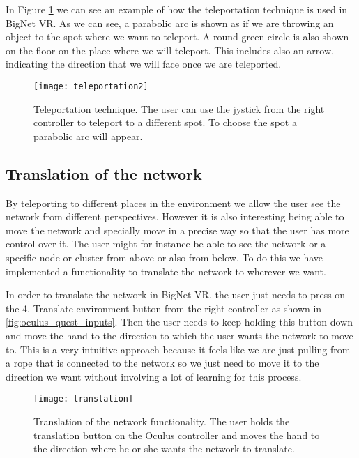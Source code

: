 In Figure \ref{fig:teleportation} we can see an example of how the teleportation technique is used in BigNet VR. As we can see, a parabolic arc is shown as if we are throwing an object to the spot where we want to teleport. A round green circle is also shown on the floor on the place where we will teleport. This includes also an arrow, indicating the direction that we will face once we are teleported.

\begin{figure}[h!]
    \centering%
    \texttt{[image: teleportation2]}
    \caption{Teleportation technique. The user can use the jystick from the right controller to teleport to a different spot. To choose the spot a parabolic arc will appear.}
    \label{fig:teleportation}
\end{figure}%

\subsection{Translation of the network}
By teleporting to different places in the environment we allow the user see the network from different perspectives. However it is also interesting being able to move the network and specially move in a precise way so that the user has more control over it. The user might for instance be able to see the network or a specific node or cluster from above or also from below. To do this we have implemented a functionality to translate the network to wherever we want.

In order to translate the network in BigNet VR, the user just needs to press on the 4. Translate environment button from the right controller as shown in \ref{fig:oculus_quest_inputs}. Then the user needs to keep holding this button down and move the hand to the direction to which the user wants the network to move to. This is a very intuitive approach because it feels like we are just pulling from a rope that is connected to the network so we just need to move it to the direction we want without involving a lot of learning for this process.

\begin{figure}[h!]
    \centering%
    \texttt{[image: translation]}
    \caption{Translation of the network functionality. The user holds the translation button on the Oculus controller and moves the hand to the direction where he or she wants the network to translate.}
    \label{fig:translation}
\end{figure}%

